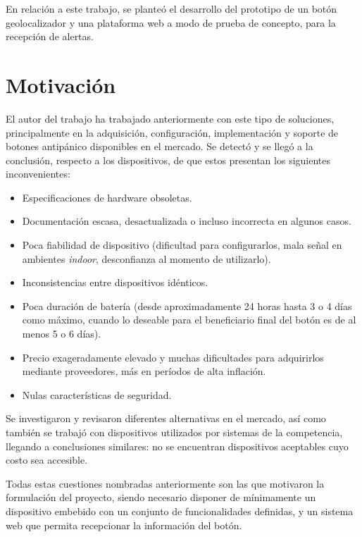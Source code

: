 En relación a este trabajo, se planteó el desarrollo del prototipo de un botón geolocalizador y una plataforma web a modo de prueba de concepto, para la recepción de alertas.


\section{Motivación}

El autor del trabajo ha trabajado anteriormente con este tipo de soluciones, principalmente en la adquisición, configuración, implementación y soporte de botones antipánico disponibles en el mercado. Se detectó y se llegó a la conclusión, respecto a los dispositivos, de que estos presentan los siguientes inconvenientes:

\begin{itemize}
\item Especificaciones de hardware obsoletas.
\item Documentación escasa, desactualizada o incluso incorrecta en algunos casos.
\item Poca fiabilidad de dispositivo (dificultad para configurarlos, mala señal en ambientes \textit{indoor}, desconfianza al momento de utilizarlo).
\item Inconsistencias entre dispositivos idénticos.
\item Poca duración de batería (desde aproximadamente 24 horas hasta 3 o 4 días como máximo, cuando lo deseable para el beneficiario final del botón es de al menos 5 o 6 días).
\item Precio exageradamente elevado y muchas dificultades para adquirirlos mediante proveedores, más en períodos de alta inflación.
\item Nulas características de seguridad.
\end{itemize}

Se investigaron y revisaron diferentes alternativas en el mercado, así como también se trabajó con dispositivos utilizados por sistemas de la competencia, llegando a conclusiones similares: no se encuentran dispositivos aceptables cuyo costo sea accesible.

Todas estas cuestiones nombradas anteriormente son las que motivaron la formulación del proyecto, siendo necesario disponer de mínimamente un dispositivo embebido con un conjunto de funcionalidades definidas, y un sistema web que permita recepcionar la información del botón.

